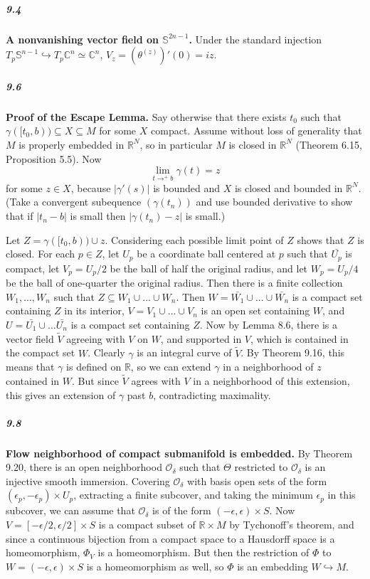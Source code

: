 \documentclass[10pt,letter]{article}
\begin{document}
\subparagraph{9.4} {\bf A  nonvanishing vector field on $\mathbb{S}^{2n-1}$.} Under the standard injection $T_p\mathbb{S}^{n-1} \hookrightarrow T_p \mathbb{C}^{n} \simeq \mathbb{C}^n$, $V_z = (\theta^{(z)})'(0) = iz$. 

\subparagraph{9.6} {\bf Proof of the Escape Lemma.} Say otherwise that there exists $t_0$ such that $\gamma([t_0,b)) \subseteq X \subseteq M$ for some $X$ compact. Assume without loss of generality that $M$ is properly embedded in $\mathbb{R}^N$, so in particular $M$ is closed in $\mathbb{R}^N$ (Theorem 6.15, Proposition 5.5). Now \[ \lim \limits_{t \rightarrow^+ b} \gamma(t) = z\] for some $z \in X$, because $\vert \gamma'(s) \vert$ is bounded and $X$ is closed and bounded in $\mathbb{R}^N$. (Take a convergent subequence $(\gamma(t_n))$ and use bounded derivative to show that if $\vert t_n - b \vert$ is small then $\vert \gamma(t_n) - z \vert$ is small.) 

Let $Z = \gamma([t_0,b)) \cup z$. Considering each possible limit point of $Z$ shows that $Z$ is closed. For each $p \in Z$, let $U_p$ be a coordinate ball centered at $p$ such that $\bar{U_p}$ is compact, let $V_p = U_p/2$ be the ball of half the original radius, and let $W_p = U_p/4$ be the ball of one-quarter the original radius. Then there is a finite collection $W_1,...,W_n$ such that $Z \subseteq W_1 \cup ... \cup W_n$. Then $W = \bar{W_1} \cup ... \cup \bar{W_n}$ is a compact set containing $Z$ in its interior, $V = V_1 \cup ... \cup V_n$ is an open set containing $W$, and $U = \bar{U_1} \cup ... \bar{U_n}$ is a compact set containing $Z$. Now by Lemma 8.6, there is a vector field $\tilde{V}$ agreeing with $V$ on $W$, and supported in $V$, which is contained in the compact set $W$. Clearly $\gamma$ is an integral curve of $\tilde{V}$. By Theorem 9.16, this means that $\gamma$ is defined on $\mathbb{R}$, so we can extend $\gamma$ in a neighborhood of $z$ contained in $W$. But since $\tilde{V}$ agrees with $V$ in a neighborhood of this extension, this gives an extension of $\gamma$ past $b$, contradicting maximality. 

\subparagraph{9.8} {\bf Flow neighborhood of compact submanifold is embedded.} By Theorem 9.20, there is an open neighborhood $\mathcal{O}_{\delta}$ such that $\Theta$ restricted to $\mathcal{O}_{\delta}$ is an injective smooth immersion. Covering $\mathcal{O}_{\delta}$ with basis open sets of the form $(\epsilon_p,-\epsilon_p) \times U_p$, extracting a finite subcover, and taking the minimum $\epsilon_{p}$ in this subcover, we can assume that $\mathcal{O}_{\delta}$ is of the form $(-\epsilon,\epsilon) \times S$. Now $V = [-\epsilon/2,\epsilon/2] \times S$ is a compact subset of $\mathbb{R} \times M$ by Tychonoff's theorem, and since a continuous bijection from a compact space to a Hausdorff space is a homeomorphism, $\Phi_V$ is a homeomorphism. But then the restriction of $\Phi$ to $W = (-\epsilon,\epsilon) \times S$ is a homeomorphism as well, so $\Phi$ is an embedding $W \hookrightarrow  M$. 
\end{document}
